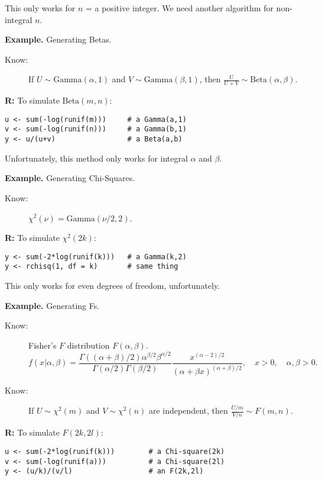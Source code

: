 \documentclass[captions=tableheading]{scrbook}
\begin{document}
\begin{itemize}
This only works for $n$ = a positive integer. We need another algorithm for non-integral $n$.


\textbf{Example.} Generating Betas.


\begin{description}
\item[Know:] If \( U\sim\mathrm{Gamma}(\alpha,1)\) and \(V\sim\mathrm{Gamma}(\beta,1)\), then \(\frac{U}{U+V}\sim\mathrm{Beta}(\alpha,\beta)\).
\end{description}

\textbf{R:} To simulate $\mathrm{Beta}(m,n)$:
\begin{verbatim}
u <- sum(-log(runif(m)))     # a Gamma(a,1)
v <- sum(-log(runif(n)))     # a Gamma(b,1)
y <- u/(u+v)                 # a Beta(a,b)
\end{verbatim}

Unfortunately, this method only works for integral $\alpha$ and $\beta$.


\textbf{Example.} Generating Chi-Squares.


\begin{description}
\item[Know:] $\chi^{2}(\nu)=\mathrm{Gamma}(\nu/2,2)$.
\end{description}

\textbf{R:} To simulate $\chi^{2}(2k)$:
\begin{verbatim}
y <- sum(-2*log(runif(k)))   # a Gamma(k,2)
y <- rchisq(1, df = k)       # same thing
\end{verbatim}

This only works for even degrees of freedom, unfortunately.


\textbf{Example.} Generating Fs.


\begin{description}
\item[Know:] Fisher's $F$ distribution $F(\alpha,\beta)$.
  \[
  f(x|\alpha,\beta)=\frac{\Gamma((\alpha+\beta)/2)\alpha^{\beta/2}\beta^{\alpha/2}}{\Gamma(\alpha/2)\Gamma(\beta/2)}\frac{x^{(\alpha-2)/2}}{(\alpha+\beta x)^{(\alpha+\beta)/2}},\quad x>0,\quad\alpha,\beta>0.
  \]
\item[Know:] If $U\sim\chi^{2}(m)$ and $V\sim\chi^{2}(n)$ are independent, then $\frac{U/m}{V/n}\sim F(m,n)$.
\end{description}

\textbf{R:} To simulate $F(2k,2l)$:

\begin{verbatim}
u <- sum(-2*log(runif(k)))        # a Chi-square(2k)
v <- sum(-log(runif(a)))          # a Chi-square(2l)
y <- (u/k)/(v/l)                  # an F(2k,2l)
\end{verbatim}


\end{itemize}
\end{document}
